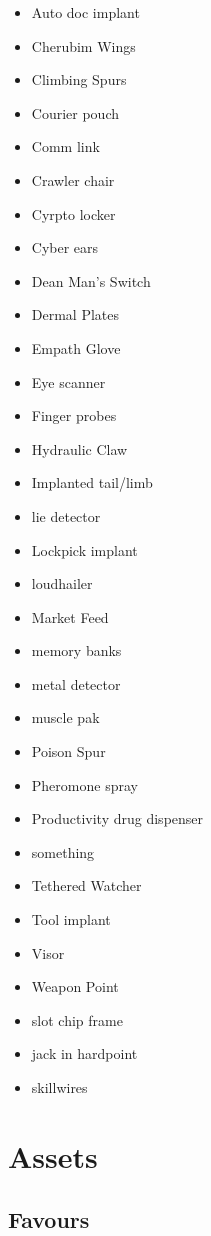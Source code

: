 \documentclass{tufte-book}
\begin{document}
\begin{itemize}

\item Auto doc implant
\item Cherubim Wings
\item Climbing Spurs
\item Courier pouch
\item Comm link
\item Crawler chair
\item Cyrpto locker
\item Cyber ears

\item Dean Man's Switch
\item Dermal Plates
\item Empath Glove
\item Eye scanner
\item Finger probes
\item Hydraulic Claw
\item Implanted tail/limb
\item lie detector
\item Lockpick implant
\item loudhailer
\item Market Feed
\item memory banks
\item metal detector
\item muscle pak
\item Poison Spur
\item Pheromone spray
\item Productivity drug dispenser
\item something
\item Tethered Watcher
\item Tool implant
\item Visor
\item Weapon Point


\item slot chip frame
\item jack in hardpoint
\item skillwires

\end{itemize}

\chapter{Assets} 	\label{ch:assets}
\section {Favours}	\label{sec:favours}
\end{document}
